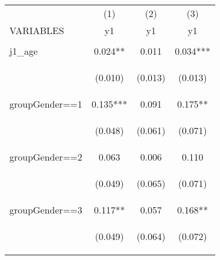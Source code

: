 \begin{center}
\begin{tabular}{lccc} \hline
 & (1) & (2) & (3) \\
VARIABLES & y1 & y1 & y1 \\ \hline
\vspace{4pt} & \begin{footnotesize}\end{footnotesize} & \begin{footnotesize}\end{footnotesize} & \begin{footnotesize}\end{footnotesize} \\
j1\_age & 0.024** & 0.011 & 0.034*** \\
\vspace{4pt} & \begin{footnotesize}(0.010)\end{footnotesize} & \begin{footnotesize}(0.013)\end{footnotesize} & \begin{footnotesize}(0.013)\end{footnotesize} \\
groupGender==1 & 0.135*** & 0.091 & 0.175** \\
\vspace{4pt} & \begin{footnotesize}(0.048)\end{footnotesize} & \begin{footnotesize}(0.061)\end{footnotesize} & \begin{footnotesize}(0.071)\end{footnotesize} \\
groupGender==2 & 0.063 & 0.006 & 0.110 \\
\vspace{4pt} & \begin{footnotesize}(0.049)\end{footnotesize} & \begin{footnotesize}(0.065)\end{footnotesize} & \begin{footnotesize}(0.071)\end{footnotesize} \\
groupGender==3 & 0.117** & 0.057 & 0.168** \\
\vspace{4pt} & \begin{footnotesize}(0.049)\end{footnotesize} & \begin{footnotesize}(0.064)\end{footnotesize} & \begin{footnotesize}(0.072)\end{footnotesize} \\

\end{tabular}
\end{center}
